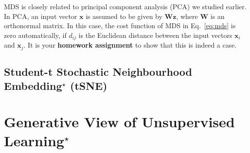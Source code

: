 \documentclass{report}
\newcommand{\vect}[1]{\mathbf{#1}}
\newcommand{\matr}[1]{\mathbf{#1}}
\newcommand{\vx}[0]{\vect{x}}
\newcommand{\vz}[0]{\vect{z}}
\newcommand{\mW}[0]{\matr{W}}
\newcommand{\todo}[1]{{\Large\textcolor{red}{#1}}}
\DeclareMathOperator*{\argmax}{\arg \max}
\begin{document}
MDS is closely related to principal component analysis (PCA) we studied earlier.
In PCA, an input vector $\vx$ is assumed to be given by $\mW \vz$, where $\mW$
is an orthonormal matrix. In this case, the cost function of MDS in
Eq.~\eqref{eq:mds} is zero automatically, if $d_{ij}$ is the Euclidean distance
between the input vectors $\vx_i$ and $\vx_j$. It is your {\bf homework
assignment} to show that this is indeed a case. 


\subsection{Student-t Stochastic Neighbourhood Embedding$^\star$ (tSNE)}


\section{Generative View of Unsupervised Learning$^\star$}

%
%
%
%
\end{document}

